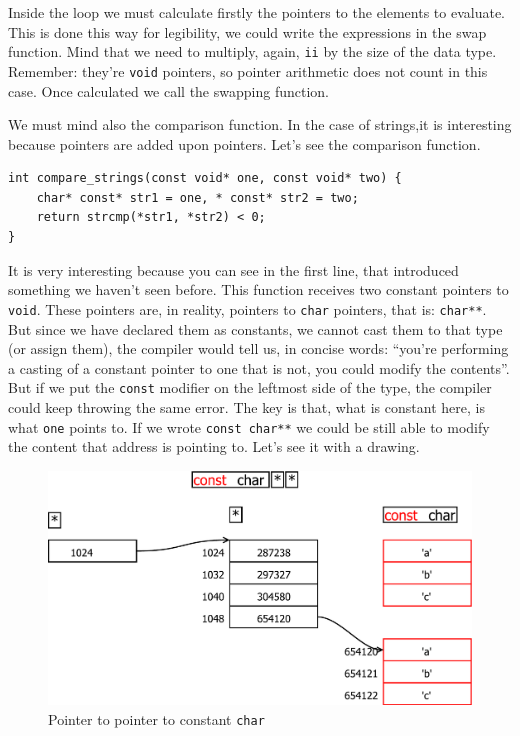 \documentclass[a4paper]{article}
\begin{document}
Inside the loop we must calculate firstly the pointers to the elements to
evaluate. This is done this way for legibility, we could write the expressions
in the swap function. Mind that we need to multiply, again, \verb!ii! by the
size of the data type. Remember: they're \verb"void" pointers, so pointer
arithmetic does not count in this case. Once calculated we call the swapping
function.

We must mind also the comparison function. In the case of strings,it is
interesting because pointers are added upon pointers. Let's see the comparison
function.

\noindent
\begin{minipage}[H]{\linewidth}
\mbox{}
\begin{lstlisting}[style=C,
caption={Auxiliary function for strings comparison},
label={lst:strcompare}]
int compare_strings(const void* one, const void* two) {
    char* const* str1 = one, * const* str2 = two;
    return strcmp(*str1, *str2) < 0;
}
\end{lstlisting}
\end{minipage}

It is very interesting because you can see in the first line, that introduced
something we haven't seen before. This function receives two constant pointers
to \verb!void!. These pointers are, in reality, pointers to \verb!char!
pointers, that is: \verb!char**!. But since we have declared them as constants,
we cannot cast them to that type (or assign them), the compiler would tell us,
in concise words: ``you're performing a casting of a constant pointer to one
that is not, you could modify the contents''. But if we put the \verb!const!
modifier on the leftmost side of the type, the compiler could keep throwing
the same error. The key is that, what is constant here, is what \verb!one!
points to. If we wrote \verb!const char**! we could be still able to modify
the content that address is pointing to. Let's see it with a drawing.

\begin{figure}[H]
    \includegraphics[width=\linewidth]{const_char_pointer_pointer}
    \caption{Pointer to pointer to constant \texttt{char}}
    \label{img:constcharpointerpointer}
\end{figure}
\end{document}
